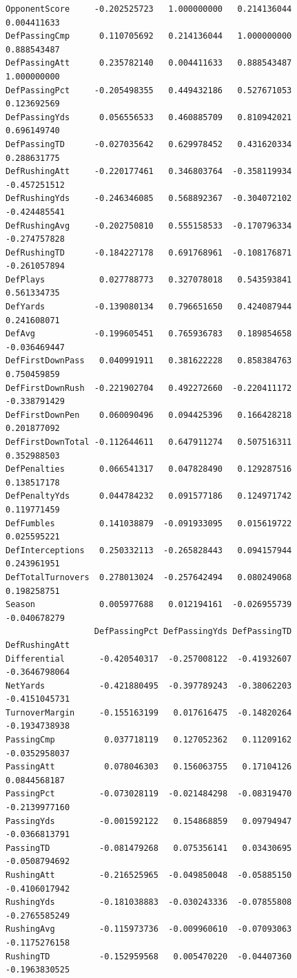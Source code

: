 \documentclass[
  letterpaper,
  DIV=11,
  numbers=noendperiod]{scrreprt}
\begin{document}
\begin{verbatim}
OpponentScore     -0.202525723   1.000000000   0.214136044   0.004411633
DefPassingCmp      0.110705692   0.214136044   1.000000000   0.888543487
DefPassingAtt      0.235782140   0.004411633   0.888543487   1.000000000
DefPassingPct     -0.205498355   0.449432186   0.527671053   0.123692569
DefPassingYds      0.056556533   0.460885709   0.810942021   0.696149740
DefPassingTD      -0.027035642   0.629978452   0.431620334   0.288631775
DefRushingAtt     -0.220177461   0.346803764  -0.358119934  -0.457251512
DefRushingYds     -0.246346085   0.568892367  -0.304072102  -0.424485541
DefRushingAvg     -0.202750810   0.555158533  -0.170796334  -0.274757828
DefRushingTD      -0.184227178   0.691768961  -0.108176871  -0.261057894
DefPlays           0.027788773   0.327078018   0.543593841   0.561334735
DefYards          -0.139080134   0.796651650   0.424087944   0.241608071
DefAvg            -0.199605451   0.765936783   0.189854658  -0.036469447
DefFirstDownPass   0.040991911   0.381622228   0.858384763   0.750459859
DefFirstDownRush  -0.221902704   0.492272660  -0.220411172  -0.338791429
DefFirstDownPen    0.060090496   0.094425396   0.166428218   0.201877092
DefFirstDownTotal -0.112644611   0.647911274   0.507516311   0.352988503
DefPenalties       0.066541317   0.047828490   0.129287516   0.138517178
DefPenaltyYds      0.044784232   0.091577186   0.124971742   0.119771459
DefFumbles         0.141038879  -0.091933095   0.015619722   0.025595221
DefInterceptions   0.250332113  -0.265828443   0.094157944   0.243961951
DefTotalTurnovers  0.278013024  -0.257642494   0.080249068   0.198258751
Season             0.005977688   0.012194161  -0.026955739  -0.040678279
                  DefPassingPct DefPassingYds DefPassingTD DefRushingAtt
Differential       -0.420540317  -0.257008122  -0.41932607 -0.3646798064
NetYards           -0.421880495  -0.397789243  -0.38062203 -0.4151045731
TurnoverMargin     -0.155163199   0.017616475  -0.14820264 -0.1934738938
PassingCmp          0.037718119   0.127052362   0.11209162 -0.0352958037
PassingAtt          0.078046303   0.156063755   0.17104126  0.0844568187
PassingPct         -0.073028119  -0.021484298  -0.08319470 -0.2139977160
PassingYds         -0.001592122   0.154868859   0.09794947 -0.0366813791
PassingTD          -0.081479268   0.075356141   0.03430695 -0.0508794692
RushingAtt         -0.216525965  -0.049850048  -0.05885150 -0.4106017942
RushingYds         -0.181038883  -0.030243336  -0.07855808 -0.2765585249
RushingAvg         -0.115973736  -0.009960610  -0.07093063 -0.1175276158
RushingTD          -0.152959568   0.005470220  -0.04407360 -0.1963830525

\end{verbatim}
\end{document}
